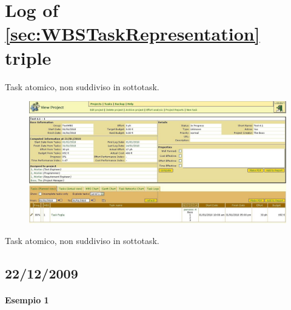 \section{Log of \ref{sec:WBSTaskRepresentation} triple}

Task atomico, non suddiviso in sottotask.
\newpage
\begin{figure} 
\centering
\includegraphics[width=1\textwidth]{tests/TEST_WBS/4.1/4.1_1/Esempio_1/input.png}
\end{figure}


Task atomico, non suddiviso in sottotask.
\subsection{22/12/2009}
\paragraph{Esempio 1}
